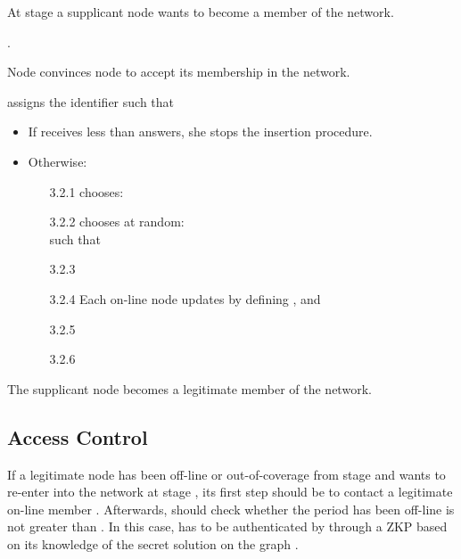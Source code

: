 \documentclass[conference]{IEEEtran}
\begin{document}
\begin{description}

    \item  [Input:] At stage  a supplicant node  wants to become a member
of the network.
\item [1.].
    \item [2.] Node  convinces node  to accept its membership in the network.
    \item [2.]  assigns  the identifier  such that 
    \item [3.]
    \item \begin {itemize}
      \item [3.1] If  receives less than  answers, she stops the insertion procedure.
      \item [3.2]Otherwise:
    \begin{enumerate}
     \item [3.2.1] chooses:\\
            
\item [3.2.2] chooses at random:\\
       such that
    
    \item [3.2.3] 
    \item [3.2.4]Each on-line node updates  by defining ,  and
     
    \item [3.2.5] 
    \item [3.2.6] 
\end{enumerate}
\end {itemize}


\item [Output:]  The supplicant node  becomes a legitimate member of the
network.
\end{description}


\subsection{Access Control}
\label{Sub:AcCont}

If a legitimate node  has been off-line
or out-of-coverage from stage  and wants to re-enter into the
network at stage , its first step should be to contact a
legitimate on-line member . Afterwards,  should check
whether the period  has been off-line is not greater than . In
this case,  has to be authenticated by  through a ZKP based on its
knowledge of the secret solution  on the graph .
\end{document}
